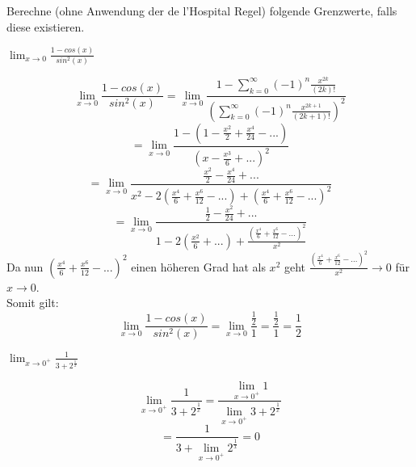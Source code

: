 Berechne (ohne Anwendung der de l'Hospital Regel) folgende Grenzwerte, falls diese existieren.
\begin{minipage}[t]{0.5\textwidth}
    \begin{subtask}
        $\lim_{x\to0}\frac{1-cos(x)}{sin^2(x)}$
    \end{subtask}
    \begin{solution}
        \[
            \lim_{x\to0}\frac{1-cos(x)}{sin^2(x)}
            =\lim_{x\to0}\frac{1-\sum_{k=0}^{\infty}(-1)^n\frac{x^{2k}}{(2k)!}}{\left(\sum_{k=0}^{\infty}(-1)^n\frac{x^{2k+1}}{(2k+1)!}\right)^2}
        \]
        \[
            =\lim_{x\to0}\frac{1-(1-\frac{x^2}{2}+\frac{x^4}{24}-...)}{(x-\frac{x^3}{6}+...)^2}
        \]
        \[
            =\lim_{x\to0}\frac{\frac{x^2}{2}-\frac{x^4}{24}+...}{x^2-2(\frac{x^4}{6}+\frac{x^6}{12}-...)+(\frac{x^4}{6}+\frac{x^6}{12}-...)^2}
        \]
        \[
            =\lim_{x\to0}\frac{\frac12-\frac{x^2}{24}+...}{1-2(\frac{x^2}{6}+...)+\frac{(\frac{x^4}{6}+\frac{x^6}{12}-...)^2}{x^2}}
        \]
        Da nun $(\frac{x^4}{6}+\frac{x^6}{12}-...)^2$ einen höheren Grad hat als $x^2$ geht $\frac{(\frac{x^4}{6}+\frac{x^6}{12}-...)^2}{x^2}\to0$ für $x\to0$. \\
        Somit gilt:
        \[
            \lim_{x\to0}\frac{1-cos(x)}{sin^2(x)}
            =\lim_{x\to0}\frac{\frac12}{1}
            =\frac{\frac12}{1}=\frac12
        \]
    \end{solution}
\end{minipage} %
\begin{minipage}[t]{0.5\textwidth}
    \begin{subtask}
        $\lim_{x\to0^+}\frac{1}{3+2^{\frac{1}{x}}}$
    \end{subtask}
    \begin{solution}
        \[
            \lim_{x\to0^+}\frac{1}{3+2^{\frac{1}{x}}}
            =\frac{\lim_{x\to0^+}1}{\lim_{x\to0^+}3+2^{\frac{1}{x}}}
        \]
        \[
            =\frac{1}{3+\lim_{x\to0^+}2^{\frac{1}{x}}}=0
        \]
    \end{solution}
\end{minipage}\\

